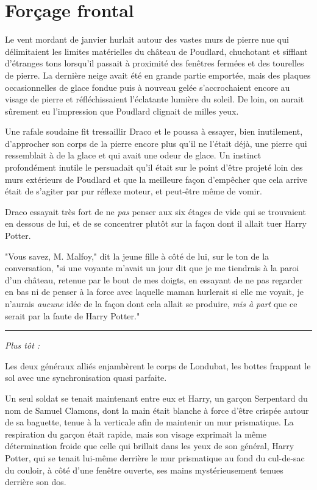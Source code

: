 
\chapter{Forçage frontal}

Le vent mordant de janvier hurlait autour des vastes murs de pierre nue qui délimitaient les limites matérielles du château de Poudlard, chuchotant et sifflant d'étranges tons lorsqu'il passait à proximité des fenêtres fermées et des tourelles de pierre. La dernière neige avait été en grande partie emportée, mais des plaques occasionnelles de glace fondue puis à nouveau gelée s'accrochaient encore au visage de pierre et réfléchissaient l'éclatante lumière du soleil. De loin, on aurait sûrement eu l'impression que Poudlard clignait de milles yeux.

Une rafale soudaine fit tressaillir Draco et le poussa à essayer, bien inutilement, d'approcher son corps de la pierre encore plus qu'il ne l'était déjà, une pierre qui ressemblait à de la glace et qui avait une odeur de glace. Un instinct profondément inutile le persuadait qu'il était sur le point d'être projeté loin des murs extérieurs de Poudlard et que la meilleure façon d'empêcher que cela arrive était de s'agiter par pur réflexe moteur, et peut-être même de vomir.

Draco essayait très fort de ne \emph{pas}  penser aux six étages de vide qui se trouvaient en dessous de lui, et de se concentrer plutôt sur la façon dont il allait tuer Harry Potter.

"Vous savez, M. Malfoy," dit la jeune fille à côté de lui, sur le ton de la conversation, "si une voyante m'avait un jour dit que je me tiendrais à la paroi d'un château, retenue par le bout de mes doigts, en essayant de ne pas regarder en bas ni de penser à la force avec laquelle maman hurlerait si elle me voyait, je n'aurais \emph{aucune}  idée de la façon dont cela allait se produire, \emph{mis à part}  que ce serait par la faute de Harry Potter."
\par\noindent\rule{\textwidth}{0.4pt}
\emph{Plus tôt :} 

Les deux généraux alliés enjambèrent le corps de Londubat, les bottes frappant le sol avec une synchronisation quasi parfaite.

Un seul soldat se tenait maintenant entre eux et Harry, un garçon Serpentard du nom de Samuel Clamons, dont la main était blanche à force d'être crispée autour de sa baguette, tenue à la verticale afin de maintenir un mur prismatique. La respiration du garçon était rapide, mais son visage exprimait la même détermination froide que celle qui brillait dans les yeux de son général, Harry Potter, qui se tenait lui-même derrière le mur prismatique au fond du cul-de-sac du couloir, à côté d'une fenêtre ouverte, ses mains mystérieusement tenues derrière son dos.

